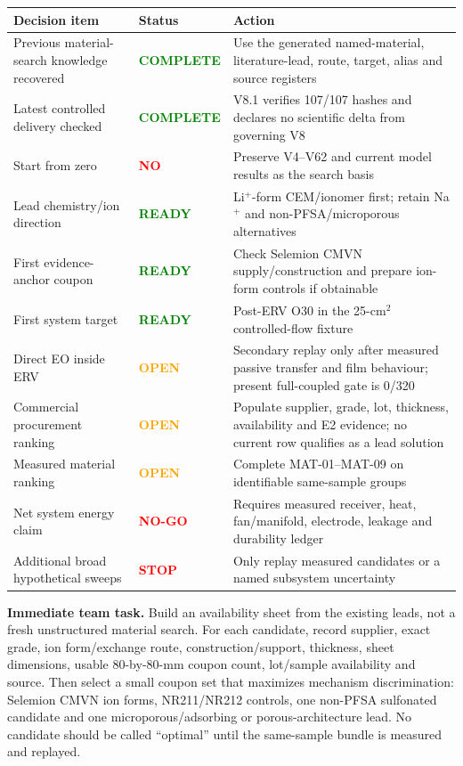 \documentclass[10pt,a4paper]{article}
\begin{document}
\begin{center}\small
\begin{tabularx}{\textwidth}{@{}p{48mm}p{22mm}Y@{}}
\toprule
\textbf{Decision item} & \textbf{Status} & \textbf{Action} \\
\midrule
Previous material-search knowledge recovered & \textcolor{Green}{\textbf{COMPLETE}} & Use the generated named-material, literature-lead, route, target, alias and source registers \\
Latest controlled delivery checked & \textcolor{Green}{\textbf{COMPLETE}} & V8.1 verifies 107/107 hashes and declares no scientific delta from governing V8 \\
Start from zero & \textcolor{Red}{\textbf{NO}} & Preserve V4--V62 and current model results as the search basis \\
Lead chemistry/ion direction & \textcolor{Green}{\textbf{READY}} & Li$^+$-form CEM/ionomer first; retain Na$^+$ and non-PFSA/microporous alternatives \\
First evidence-anchor coupon & \textcolor{Green}{\textbf{READY}} & Check Selemion CMVN supply/construction and prepare ion-form controls if obtainable \\
First system target & \textcolor{Green}{\textbf{READY}} & Post-ERV O30 in the 25-cm$^2$ controlled-flow fixture \\
Direct EO inside ERV & \textcolor{Orange}{\textbf{OPEN}} & Secondary replay only after measured passive transfer and film behaviour; present full-coupled gate is 0/320 \\
Commercial procurement ranking & \textcolor{Orange}{\textbf{OPEN}} & Populate supplier, grade, lot, thickness, availability and E2 evidence; no current row qualifies as a lead solution \\
Measured material ranking & \textcolor{Orange}{\textbf{OPEN}} & Complete MAT-01--MAT-09 on identifiable same-sample groups \\
Net system energy claim & \textcolor{Red}{\textbf{NO-GO}} & Requires measured receiver, heat, fan/manifold, electrode, leakage and durability ledger \\
Additional broad hypothetical sweeps & \textcolor{Red}{\textbf{STOP}} & Only replay measured candidates or a named subsystem uncertainty \\
\bottomrule
\end{tabularx}
\end{center}

\begin{mainbox}
\textbf{Immediate team task.} Build an availability sheet from the existing
leads, not a fresh unstructured material search. For each candidate, record
supplier, exact grade, ion form/exchange route, construction/support,
thickness, sheet dimensions, usable 80-by-80-mm coupon count, lot/sample
availability and source. Then select a small coupon set
that maximizes mechanism discrimination: Selemion CMVN ion forms, NR211/NR212
controls, one non-PFSA sulfonated candidate and one microporous/adsorbing or
porous-architecture lead. No candidate should be called ``optimal'' until the
same-sample bundle is measured and replayed.
\end{mainbox}
\end{document}
